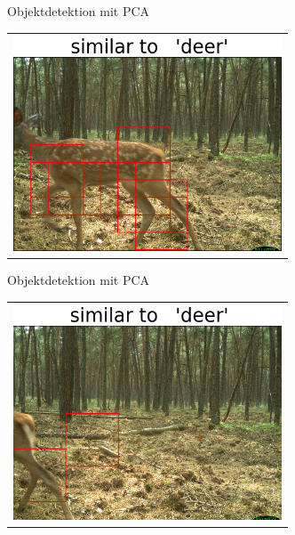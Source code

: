 \begin{frame}[t,fragile]{Objektdetektion mit  PCA}
  \vspace{0.01em}
  {
\begin{table}
\centering
        \begin{tabular}{c}
        \includegraphics[width=8cm]{images/Segmentierung/seg(6).png}\\
         \end{tabular}
\end{table}
 }

\end{frame}


\begin{frame}[t,fragile]{Objektdetektion mit  PCA}
  \vspace{0.01em}
  {
\begin{table}
\centering
        \begin{tabular}{c}
        \includegraphics[width=8cm]{images/Segmentierung/seg(7).png}\\
         \end{tabular}
\end{table}
 }

\end{frame}


